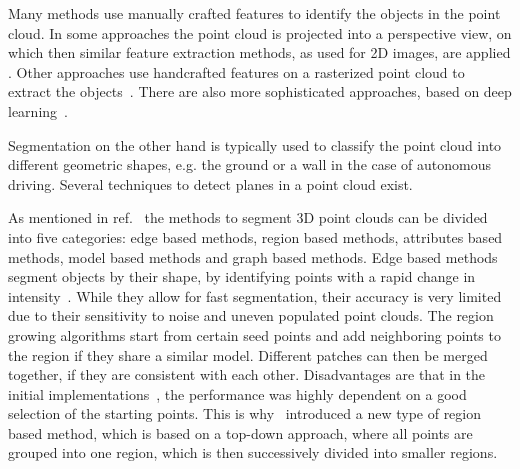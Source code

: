 Many methods use manually crafted features to identify the objects in the point cloud.
In some approaches the point cloud is projected into a perspective view, on which then similar feature extraction methods, as used for 2D images, are applied
\cite{Premebida2014, Li2016}.
Other approaches use handcrafted features on a rasterized point cloud to extract the objects~\cite{Song2014, Song2016}.
There are also more sophisticated approaches, based on deep learning~\cite{Qi2017, Qi2017b, Zhuo2018}.

Segmentation on the other hand is typically used to classify the point cloud into different geometric shapes, e.g. the ground or a wall in the case of autonomous driving.
Several techniques to detect planes in a point cloud exist.

As mentioned in ref.~\cite{Nguyen2013} the methods to segment 3D point clouds can be divided into five categories: edge based methods, region based methods, attributes based methods, model based methods and graph based methods.
Edge based methods segment objects by their shape, by identifying points with a rapid change in intensity~\cite{Sappa2001}. While they allow for fast segmentation, their accuracy is very limited due to their sensitivity to noise and uneven populated point clouds.
The region growing algorithms start from certain seed points and add neighboring points to the region if they share a similar model.
Different patches can then be merged together, if they are consistent with each other.
Disadvantages are that in the initial implementations~\cite{Besl1988, Taubin1991}, the performance was highly dependent on a good selection of the starting points.
This is why~\cite{Chen2008} introduced a new type of region based method, which is based on a top-down approach, where all points are grouped into one region, which is then successively divided into smaller regions.

